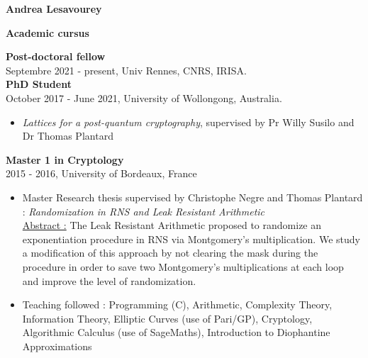 \documentclass[a4paper,12pt,final]{memoir}
\newcommand{\SmallSep}{\vspace{0.5em}}
\newcommand{\CVSection}[1]
{\Large\textbf{#1}\par
  \SmallSep\normalsize\normalfont}
\newcommand{\CVItem}[1]
{\textbf{\color{RoyalBlue} #1}}
\begin{document}
% 
\begin{flushright}\small

\end{flushright}\normalsize
\framebreak


\Huge\bfseries {\color{RoyalBlue} Andrea Lesavourey}  \\
\normalsize\normalfont

\CVSection{Academic cursus} 

\CVItem{Post-doctoral fellow}\\
Septembre 2021 - present, Univ Rennes, CNRS, IRISA. \\


\CVItem{PhD Student}\\
October 2017 - June 2021, University of Wollongong, Australia.
\begin{itemize}
\item \textit{Lattices for a post-quantum cryptography}, supervised by Pr Willy Susilo and Dr Thomas Plantard
\end{itemize}

\SmallSep



\CVItem{Master 1 in Cryptology}\\
2015 - 2016, University of Bordeaux, France

\begin{itemize}
\item Master Research thesis supervised by Christophe Negre and Thomas Plantard : \textit{Randomization in RNS and Leak Resistant Arithmetic} \\
  \underline{Abstract :} The Leak Resistant Arithmetic proposed to randomize an exponentiation procedure in RNS via Montgomery’s multiplication. We study a modification of this approach by not clearing the mask during the procedure in order to save two Montgomery’s multiplications at each loop and improve the level of randomization.

\item Teaching followed : Programming (C), Arithmetic, Complexity Theory, Information Theory, Elliptic Curves (use of Pari/GP), Cryptology, Algorithmic Calculus (use of SageMaths), Introduction to Diophantine Approximations
\end{itemize}
\SmallSep
\end{document}
